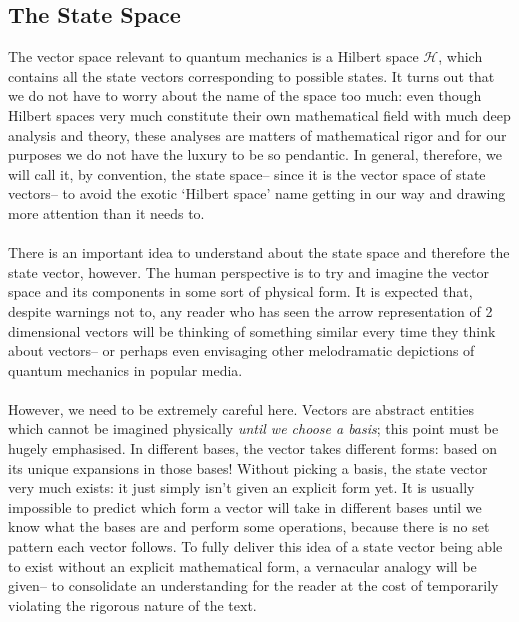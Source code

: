\subsection{The State Space}
The vector space relevant to quantum mechanics is a Hilbert space $\mathscr{H}$, which contains all the state vectors corresponding to possible states. It turns out that we do not have to worry about the name of the space too much: even though Hilbert spaces very much constitute their own mathematical field with much deep analysis and theory, these analyses are matters of mathematical rigor and for our purposes we do not have the luxury to be so pendantic. In general, therefore, we will call it, by convention, the state space-- since it is the vector space of state vectors-- to avoid the exotic `Hilbert space' name getting in our way and drawing more attention than it needs to.
\\\\
There is an important idea to understand about the state space and therefore the state vector, however. The human perspective is to try and imagine the vector space and its components in some sort of physical form. It is expected that, despite warnings not to, any reader who has seen the arrow representation of 2 dimensional vectors will be thinking of something similar every time they think about vectors-- or perhaps even envisaging other melodramatic depictions of  quantum mechanics in popular media.
\\\\
However, we need to be extremely careful here. Vectors are abstract entities which cannot be imagined physically \textit{until we choose a basis}; this point must be hugely emphasised. In different bases, the vector takes different forms: based on its unique expansions in those bases! Without picking a basis, the state vector very much exists: it just simply isn't given an explicit form yet. It is usually impossible to predict which form a vector will take in different bases until we know what the bases are and perform some operations, because there is no set pattern each vector follows. To fully deliver this idea of a state vector being able to exist without an explicit mathematical form, a vernacular analogy will be given-- to consolidate an understanding for the reader at the cost of temporarily violating the rigorous nature of the text. 
\\\\
